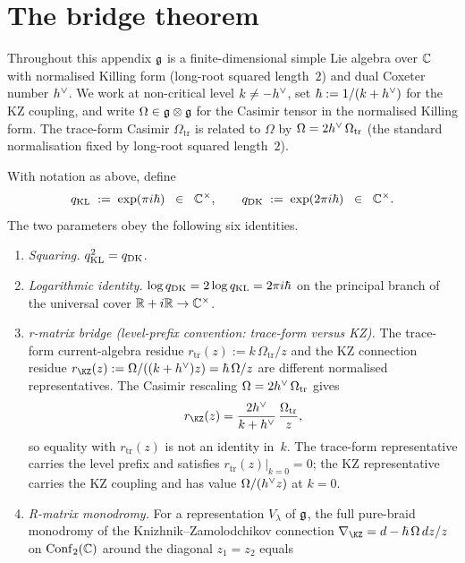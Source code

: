 \section{The bridge theorem}
\label{sec:q-bridge-theorem}

Throughout this appendix $\mathfrak{g}$ is a finite-dimensional simple Lie
algebra over $\mathbb{C}$ with normalised Killing form (long-root
squared length~$2$) and dual Coxeter number $h^{\vee}$. We work at
non-critical level $k \neq -h^{\vee}$, set
$\hbar := 1/(k + h^{\vee})$ for the KZ coupling, and write $\Omega \in
\mathfrak{g} \otimes \mathfrak{g}$ for the Casimir tensor in the normalised Killing
form. The trace-form Casimir $\Omega_{\mathrm{tr}}$ is related to
$\Omega$ by
$\Omega = 2h^{\vee} \, \Omega_{\mathrm{tr}}$
(the standard normalisation fixed by long-root squared length~$2$).

\begin{theorem}
\label{thm:q-convention-bridge-main}
\ClaimStatusProvedHere
With notation as above, define
\[
q_{\mathrm{KL}} \;:=\; \exp(\pi i \hbar)
\;\;\in\;\; \mathbb{C}^{\times},
\qquad
q_{\mathrm{DK}} \;:=\; \exp(2 \pi i \hbar)
\;\;\in\;\; \mathbb{C}^{\times}.
\]
The two parameters obey the following six identities.
\begin{enumerate}
\item[\textup{(i)}] \emph{Squaring.}
$q_{\mathrm{KL}}^{2} = q_{\mathrm{DK}}$.
\item[\textup{(ii)}] \emph{Logarithmic identity.}
$\log q_{\mathrm{DK}} = 2 \log q_{\mathrm{KL}} = 2 \pi i \hbar$ on the principal
branch of the universal cover $\mathbb{R} + i \mathbb{R} \to \mathbb{C}^{\times}$.
\item[\textup{(iii)}] \emph{r-matrix bridge \textup{(level-prefix
convention: trace-form versus KZ)}.}
The trace-form current-algebra residue
$r_{\mathrm{tr}}(z):=k\,\Omega_{\mathrm{tr}}/z$ and the KZ
connection residue
$r_{\KZ}(z):=\Omega/((k+\hv)z)=\hbar\,\Omega/z$ are different
normalised representatives. The Casimir rescaling
$\Omega=2h^{\vee}\,\Omega_{\mathrm{tr}}$ gives
\[
r_{\KZ}(z)=\frac{2\hv}{k+\hv}\,
\frac{\Omega_{\mathrm{tr}}}{z},
\]
so equality with $r_{\mathrm{tr}}(z)$ is not an identity in~$k$.
The trace-form representative carries the level prefix and satisfies
$r_{\mathrm{tr}}(z)|_{k=0}=0$; the KZ representative carries the
KZ coupling and has value $\Omega/(h^{\vee} z)$ at $k=0$.
\item[\textup{(iv)}] \emph{R-matrix monodromy.}
For a representation $V_{\lambda}$ of $\mathfrak{g}$, the full pure-braid
monodromy of the Knizhnik--Zamolodchikov connection
$\nabla_{\KZ} = d - \hbar\, \Omega \, dz/z$ on
$\mathrm{Conf}_{2}(\mathbb{C})$ around the diagonal $z_{1} = z_{2}$ equals

\end{enumerate}
\end{theorem}
